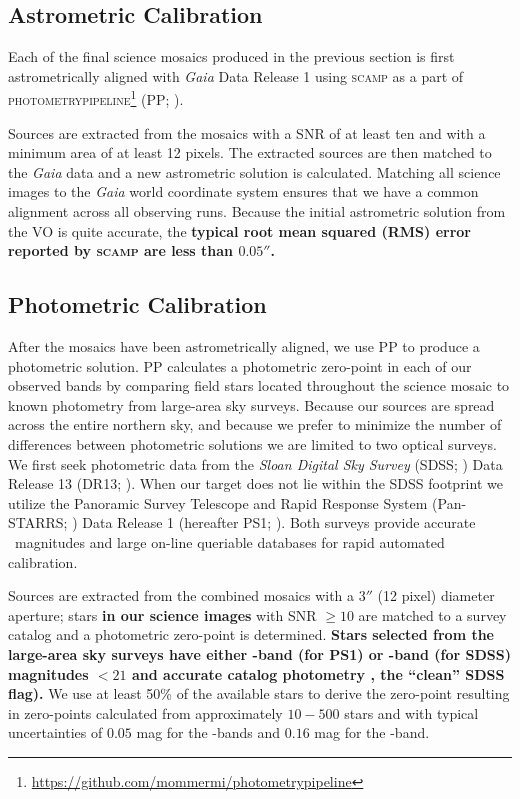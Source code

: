 \documentclass[apj, revtex4-1]{emulateapj}
\begin{document}

\subsection{Astrometric Calibration}
Each of the final science mosaics produced in the previous section is first astrometrically aligned with \textit{Gaia} \citep{GaiaCollaboration2016} Data Release 1 \citep{GaiaCollaboration2016a} using \textsc{scamp} \citep{Bertin2006} as a part of \textsc{photometrypipeline}\footnote{\url{https://github.com/mommermi/photometrypipeline}} (PP; \citealt{Mommert2017}).

Sources are extracted from the mosaics with a SNR of at least ten and with a minimum area of at least 12 pixels. The extracted sources are then matched to the \textit{Gaia} data and a new astrometric solution is calculated. Matching all science images to the \textit{Gaia} world coordinate system ensures that we have a common alignment across all observing runs. Because the initial astrometric solution from the VO is quite accurate, the
\textbf{typical root mean squared (RMS) error reported by \textsc{scamp} are less than $0.05''$.}

\subsection{Photometric Calibration}
After the mosaics have been astrometrically aligned, we use PP to produce a photometric solution. PP calculates a photometric zero-point in each of our observed bands by comparing field stars located throughout the science mosaic to known photometry from large-area sky surveys. Because our sources are spread across the entire northern sky, and because we prefer to minimize the number of differences between photometric solutions we are limited to two optical surveys. We first seek photometric data from the \textit{Sloan Digital Sky Survey} (SDSS; \citealt{York2000}) Data Release 13 (DR13; \citealt{Albareti2017}). When our target does not lie within the SDSS footprint we utilize the Panoramic Survey Telescope and Rapid Response System (Pan-STARRS; \citealt{Chambers2016}) Data Release 1 (hereafter PS1; \citealt{Flewelling2016}). Both surveys provide accurate \sdssg\sdssr\sdssi\sdssz\ magnitudes and large on-line queriable databases for rapid automated calibration.

Sources are extracted from the combined mosaics with a $3''$ (12 pixel) diameter aperture; stars \textbf{in our science images} with SNR $\ge10$ are matched to a survey catalog and a photometric zero-point is determined. \textbf{Stars selected from the large-area sky surveys have either \sdssr-band (for PS1) or \sdssg-band (for SDSS) magnitudes $<21$ and accurate catalog photometry \eg, the ``clean'' SDSS flag).} We use at least 50\% of the available stars to derive the zero-point resulting in zero-points calculated from approximately $10-500$ stars and with typical uncertainties of $0.05$ mag for the \sdssg\sdssr\sdssi-bands and $0.16$ mag for the \sdssz-band.
\end{document}
